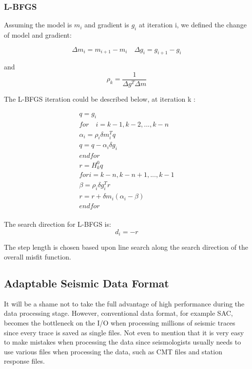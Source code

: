\documentclass[extra,mreferee]{gji}
\begin{document}
\subsubsection{L-BFGS}

Assuming the model is $m_i$ and gradient is $g_i$ at iteration i, we
defined the change of model and gradient:

\begin{equation*}
    \Delta m_i = m_{i+1} - m_i \quad
    \Delta g_i = g_{i+1} - g_i
\end{equation*}

and
\begin{equation*}
     \rho_k = \frac{1}{\Delta g^{T} \Delta m}
\end{equation*}

The L-BFGS iteration could be described below, at iteration k \citep{wright1999numerical}:

\begin{align*}
q = g_i \\
for \quad i = k -1, k-2, ..., k-n \\
    \alpha_i = \rho_i \delta m_{i}^{T} q \\
    q = q - \alpha_i \delta g_i \\
end for\\
r = H_k^{0}q \\
for i = k-n, k-n+1, ..., k-1 \\
    \beta = \rho_i \delta g_i^{T}r \\
    r = r + \delta m_i(\alpha_i - \beta) \\
end for \\
\end{align*}

The search direction for L-BFGS is:
$$d_i = -r$$

The step length is chosen based upon line search along the search direction of the overall misfit function.

\subsection{Adaptable Seismic Data Format}

It will be a shame not to take the full advantage of high performance during the data processing stage. However, conventional data format, for example SAC, becomes the bottleneck on the I/O when processing millions of seismic traces since every trace is saved as single files. Not even to mention that it is very easy to make mistakes when processing the data since seismologists usually needs to use various files when processing the data, such as CMT files and station response files.
\end{document}
